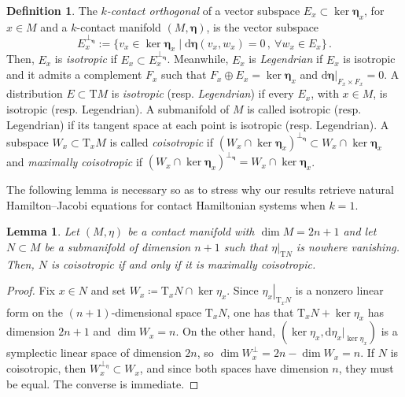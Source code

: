 \documentclass[11pt,twoside]{article}
\theoremstyle{plain}
\newtheorem{lemma}[theorem]{Lemma}
\theoremstyle{definition}
\newtheorem{definition}[theorem]{Definition}
\theoremstyle{remark}
\newcommand{\dd}{\mathrm{d}}
\newcommand{\T}{\mathrm{T}}
\newcommand\restr[2]{\left.#1\right|_{#2}} \newcommand{\bfX}{\mathbf{X}} \newcommand{\bfY}{\mathbf{Y}} \newcommand{\bfZ}{\mathbf{Z}} \newcommand{\qeddiamond}{\hfill $\diamond$} \newcommand{\parder}[2]{\frac{\partial #1}{\partial #2}} \newcommand{\dparder}[2]{\dfrac{\partial #1}{\partial #2}} \newcommand{\tparder}[2]{\partial #1/\partial #2} \newcommand{\parderr}[3]{\frac{\partial^2 #1}{\partial #2\partial #3}} \newcommand{\dparderr}[3]{\dfrac{\partial^2 #1}{\partial #2\partial #3}} \newcommand{\tparderr}[3]{\partial^2 #1/\partial #2\partial #3}
\begin{document}
\begin{definition} \label{def:IsotropicDistribution}
The {\it $k$-contact orthogonal} of a vector subspace $E_x\subset \ker \bm \eta_x$, for $x\in M$ and a $k$-contact manifold $(M,\bm \eta)$, is the vector subspace
\begin{equation}\label{eq:kConOrth}
E_x^{\perp_{\bm\eta}}:=\{v_x\in \ker \bm \eta_x \mid \dd\bm\eta(v_x,w_x)=0\,,\ \forall w_x\in E_x\}\,.
\end{equation}
Then, $E_x$ is {\it isotropic} if $E_x\subset E_x^{\perp_{\bm\eta}}$. Meanwhile, $E_x$ is {\it Legendrian} if $E_x$ is isotropic and it admits a complement $F_x$ such that $F_x\oplus E_x=\ker \bm \eta_x$ and $\dd\bm\eta\vert_{F_x\times F_x}=0$. A distribution $E\subset \T M$ is {\it isotropic} (resp. {\it Legendrian}) if every $E_x$, with $x\in M$, is isotropic (resp. Legendrian). A submanifold of $M$ is called isotropic (resp. Legendrian) if its tangent space at each point is isotropic (resp. Legendrian). A subspace $W_x\subset \T_xM$ is called {\it coisotropic} if $(W_x\cap \ker \bm\eta_x)^{\perp_{\bm \eta}} \subset W_x\cap \ker\bm\eta_x$ and {\it maximally coisotropic} if $(W_x\cap \ker \bm\eta_x)^{\perp_{\bm \eta}} = W_x\cap \ker\bm\eta_x$. 
\end{definition}

The following lemma is necessary so as to stress why our results retrieve natural Hamilton--Jacobi equations for contact Hamiltonian systems when $k=1$. 
\begin{lemma}\label{lem:coisotropic-max-coisotropic-contact-case}
Let $(M,\eta)$ be a contact manifold with $\dim M=2n+1$ and let $N\subset M$ be a submanifold of dimension $n+1$ such that $\restr{\eta}{\T N}$ is nowhere vanishing. Then, $N$ is coisotropic if and only if it is maximally coisotropic.
\end{lemma}

\begin{proof}
Fix $x\in N$ and set $W_x\coloneqq \T_xN\cap\ker\eta_x$. Since $\restr{\eta_x}{\T_xN}$ is a nonzero linear form on the $(n+1)$-dimensional space $\T_xN$, one has that $\T_xN+\ker \eta_x$ has dimension $2n+1$ and $\dim W_x=n$. On the other hand, $(\ker\eta_x,\dd\eta_x|_{\ker\eta_x})$ is a symplectic linear space of dimension $2n$, so $\dim W_x^{\perp}=2n-\dim W_x=n$. If $N$ is coisotropic, then $W_x^{\perp_\eta}\subset W_x$, and since both spaces have dimension $n$, they must be equal. The converse is immediate.
\end{proof}
\end{document}
